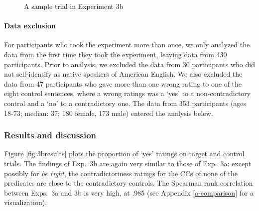\documentclass[11pt,fleqn]{article}
\newcommand{\6}{\mbox{$[\hspace*{-.6mm}[$}}
\newcommand{\9}{\mbox{$]\hspace*{-.6mm}]$}}
\begin{document}
{\begin{figure}[h!]
\begin{center}
\end{center}
\caption{A sample trial in Experiment 3b}\label{fig-trial-exp3b}
\end{figure}


\paragraph{Data exclusion} For participants who took the experiment more than once, we only analyzed the data from the first time they took the experiment, leaving data from 430 participants. Prior to analysis, we excluded the data from 30 participants who did not self-identify as native speakers of American English. We also excluded the data from 47 participants who gave more than one wrong rating to one of the eight control sentences, where a wrong ratings was a `yes' to a non-contradictory control and a `no' to a contradictory one. The data from 353 participants (ages 18-73; median: 37; 180 female, 173 male) entered the analysis below. 
    


\subsubsection{Results and discussion}

Figure \ref{fig:3bresults} plots the proportion of `yes' ratings on target and control trials. The findings of Exp.~3b are again very similar to those of Exp.~3a: except possibly for {\em be right}, the contradictoriness ratings for the CCs of none of the predicates are close to the contradictory controls. The Spearman rank correlation between Exps.~3a and 3b is very high, at .985 (see Appendix \ref{a-comparison} for a visualization).

}
\end{document}
